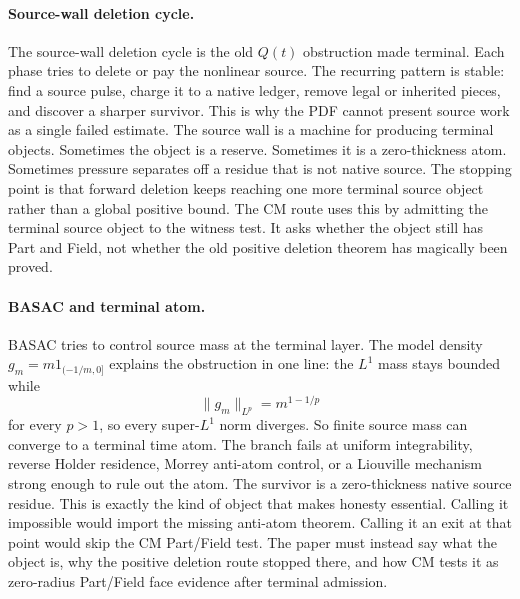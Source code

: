 \paragraph{Source-wall deletion cycle.}
The source-wall deletion cycle is the old \(Q(t)\) obstruction made terminal.
Each phase tries to delete or pay the nonlinear source.
The recurring pattern is stable: find a source pulse, charge it to a native
ledger, remove legal or inherited pieces, and discover a sharper survivor.
This is why the PDF cannot present source work as a single failed estimate.
The source wall is a machine for producing terminal objects.
Sometimes the object is a reserve.
Sometimes it is a zero-thickness atom.
Sometimes pressure separates off a residue that is not native source.
The stopping point is that forward deletion keeps reaching one more terminal
source object rather than a global positive bound.
The CM route uses this by admitting the terminal source object to the witness
test.
It asks whether the object still has Part and Field, not whether the old
positive deletion theorem has magically been proved.

\paragraph{BASAC and terminal atom.}
BASAC tries to control source mass at the terminal layer.
The model density \(g_m=m1_{(-1/m,0]}\) explains the obstruction in one line:
the \(L^1\) mass stays bounded while
\[
  \|g_m\|_{L^p}=m^{1-1/p}
\]
for every \(p>1\), so every super-\(L^1\) norm diverges.
So finite source mass can converge to a terminal time atom.
The branch fails at uniform integrability, reverse Holder residence, Morrey
anti-atom control, or a Liouville mechanism strong enough to rule out the
atom.
The survivor is a zero-thickness native source residue.
This is exactly the kind of object that makes honesty essential.
Calling it impossible would import the missing anti-atom theorem.
Calling it an exit at that point would skip the CM Part/Field test.
The paper must instead say what the object is, why the positive deletion route
stopped there, and how CM tests it as zero-radius Part/Field face evidence after
terminal admission.


